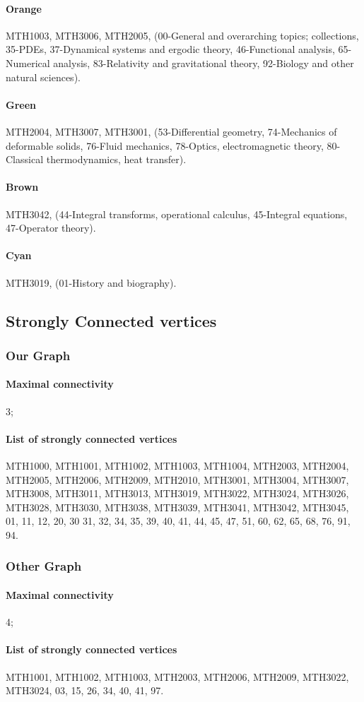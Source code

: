 \documentclass[english, 12pt]{article}
\begin{document}
\paragraph{Orange} MTH1003, MTH3006, MTH2005, (00-General and overarching topics; collections, 35-PDEs, 37-Dynamical systems and ergodic theory, 46-Functional analysis, 65-Numerical analysis, 83-Relativity and gravitational theory, 92-Biology and other natural sciences).
\paragraph{Green} MTH2004, MTH3007, MTH3001, (53-Differential geometry, 74-Mechanics of deformable solids, 76-Fluid mechanics, 78-Optics, electromagnetic theory, 80-Classical thermodynamics, heat transfer).
\paragraph{Brown} MTH3042, (44-Integral transforms, operational calculus, 45-Integral equations, 47-Operator theory).
\paragraph{Cyan} MTH3019, (01-History and biography).
\parskip=0.0pt

\subsection{Strongly Connected vertices} \label{app:strongly_connected_vertices}
\subsubsection{Our Graph}
\paragraph{Maximal connectivity} 3;
\parskip=-8.0pt
\paragraph{List of strongly connected vertices} MTH1000, MTH1001, MTH1002, MTH1003, MTH1004, MTH2003, MTH2004, MTH2005, MTH2006, MTH2009, MTH2010, MTH3001, MTH3004, MTH3007, MTH3008, MTH3011, MTH3013, MTH3019, MTH3022, MTH3024, MTH3026, MTH3028, MTH3030, MTH3038, MTH3039, MTH3041, MTH3042, MTH3045, 01, 11, 12, 20, 30 31, 32, 34, 35, 39, 40, 41, 44, 45, 47, 51, 60, 62, 65, 68, 76, 91, 94.
\parskip=0.0pt

\subsubsection{Other Graph}
\paragraph{Maximal connectivity} 4;
\parskip=-8.0pt
\paragraph{List of strongly connected vertices} MTH1001, MTH1002, MTH1003, MTH2003, MTH2006, MTH2009, MTH3022, MTH3024, 03, 15, 26, 34, 40, 41, 97.
\parskip=0.0pt
\end{document}
